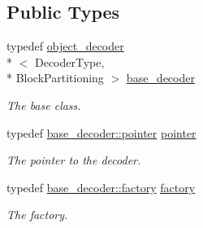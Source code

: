 \subsection*{Public Types}
\begin{DoxyCompactItemize}
\item 
typedef \hyperlink{classkodo_1_1object__decoder}{object\-\_\-decoder}\\*
$<$ Decoder\-Type, \\*
Block\-Partitioning $>$ \hyperlink{classkodo_1_1deep__storage__decoder_a0b4631c8de87e9f2a69fae2ef9dd6632}{base\-\_\-decoder}
\begin{DoxyCompactList}\small\item\em The base class. \end{DoxyCompactList}\item 
\hypertarget{classkodo_1_1deep__storage__decoder_ab50b601ef8dd7c694f6da6ced53cd3ab}{typedef \hyperlink{classkodo_1_1object__decoder_a2d53e4d4369d535ca146ac5c912d9310}{base\-\_\-decoder\-::pointer} \hyperlink{classkodo_1_1deep__storage__decoder_ab50b601ef8dd7c694f6da6ced53cd3ab}{pointer}}\label{classkodo_1_1deep__storage__decoder_ab50b601ef8dd7c694f6da6ced53cd3ab}

\begin{DoxyCompactList}\small\item\em The pointer to the decoder. \end{DoxyCompactList}\item 
\hypertarget{classkodo_1_1deep__storage__decoder_a5bf69d7131ad5759227a702b4b994bbd}{typedef \hyperlink{classkodo_1_1object__decoder_acd1470f04f34ae297bcc5a6e625f38a2}{base\-\_\-decoder\-::factory} \hyperlink{classkodo_1_1deep__storage__decoder_a5bf69d7131ad5759227a702b4b994bbd}{factory}}\label{classkodo_1_1deep__storage__decoder_a5bf69d7131ad5759227a702b4b994bbd}

\begin{DoxyCompactList}\small\item\em The factory. \end{DoxyCompactList}\end{DoxyCompactItemize}
